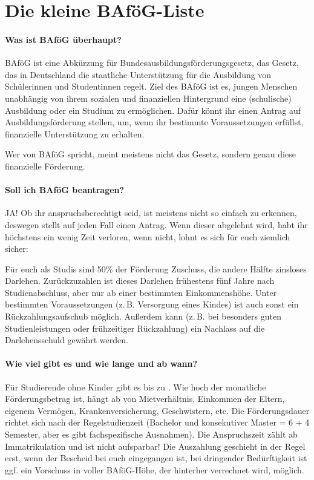 
\vspace{-2mm}
\section{Die kleine BAföG-Liste}

\paragraph{Was ist BAföG überhaupt?}
BAföG ist eine Abkürzung für \glqq{}Bundesausbildungsförderungsgesetz\grqq{}, das Gesetz, das in Deutschland die staatliche Unterstützung für die Ausbildung von Schülerinnen und Studentinnen regelt. Ziel des BAföG ist es, jungen Menschen unabhängig von ihrem sozialen und finanziellen Hintergrund eine (schulische) Ausbildung oder ein Studium zu ermöglichen. Dafür könnt ihr einen \glqq{}Antrag auf Ausbildungsförderung\grqq{} stellen, um, wenn ihr bestimmte Voraussetzungen erfüllst, finanzielle Unterstützung zu erhalten. 

Wer von BAföG spricht, meint meistens nicht das Gesetz, sondern genau diese finanzielle Förderung.

\vspace{-2mm}
\paragraph{Soll ich BAföG beantragen?}
JA! Ob ihr anspruchsberechtigt seid, ist meistens nicht so einfach zu erkennen, deswegen stellt auf jeden Fall einen Antrag. Wenn dieser abgelehnt wird, habt ihr höchstens ein wenig Zeit verloren, wenn nicht, lohnt es sich für euch ziemlich sicher:

Für euch als Studis sind 50\% der Förderung Zuschuss, die andere Hälfte zinsloses Darlehen. Zurückzuzahlen ist dieses Darlehen frühestens fünf Jahre nach Studienabschluss, aber nur ab einer bestimmten Einkommenshöhe. Unter bestimmten Voraussetzungen (z.\,B. Versorgung eines Kindes) ist auch sonst ein Rückzahlungsaufschub möglich. Außerdem kann (z.\,B. bei besonders guten Studienleistungen oder frühzeitiger Rückzahlung) ein Nachlass auf die Darlehensschuld gewährt werden.

\vspace{-2mm}
\paragraph{Wie viel gibt es und wie lange und ab wann?}
Für Studierende ohne Kinder gibt es bis zu \bafoeghoechstsatz. Wie hoch der monatliche Förderungsbetrag ist, hängt ab von Mietverhältnis, Einkommen der Eltern, eigenem Vermögen, Krankenversicherung, Geschwistern, etc. Die Förderungsdauer richtet sich nach der Regelstudienzeit (Bachelor und konsekutiver Master = 6 + 4 Semester, aber es gibt fachspezifische Ausnahmen). Die Anspruchszeit zählt ab Immatrikulation und ist nicht aufsparbar! Die Auszahlung geschieht in der Regel erst, wenn der Bescheid bei euch eingegangen ist, bei dringender Bedürftigkeit ist ggf. ein Vorschuss in voller BAföG-Höhe, der hinterher verrechnet wird, möglich.

